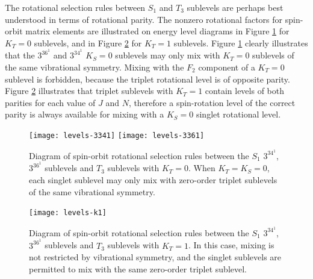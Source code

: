 \documentclass[12pt]{mitthesis}
\begin{document}

The rotational selection rules between $S_1$ and $T_3$ sublevels are
perhaps best understood in terms of rotational parity.  The nonzero
rotational factors for spin-orbit matrix elements are illustrated on
energy level diagrams in Figure \ref{fig:levels-k0} for $K_T=0$
sublevels, and in Figure \ref{fig:levels-k1} for $K_T=1$ sublevels.
Figure \ref{fig:levels-k0} clearly illustrates that the $3^36^1$ and
$3^34^1$ $K_S=0$ sublevels may only mix with $K_T=0$ sublevels of the
same vibrational symmetry.  Mixing with the $F_2$ component of a
$K_T=0$ sublevel is forbidden, because the triplet rotational level is
of opposite parity.  Figure \ref{fig:levels-k1} illustrates that
triplet sublevels with $K_T=1$ contain levels of both parities for
each value of $J$ and $N$, therefore a spin-rotation level of the
correct parity is always available for mixing with a $K_S=0$ singlet
rotational level.



\begin{figure}
  \caption{Diagram of spin-orbit rotational selection rules between
    the $S_1$ $3^34^1$, $3^36^1$  sublevels and $T_3$ sublevels
    with $K_T=0$.  When $K_T=K_S=0$, each singlet sublevel may only
    mix with zero-order triplet sublevels of the same vibrational
    symmetry.}
  \label{fig:levels-k0}
  \centering
  \vspace{5mm}
  \texttt{[image: levels-3341]}
  \texttt{[image: levels-3361]}  
\end{figure}

\begin{figure}
  \caption{Diagram of spin-orbit rotational selection rules between
    the $S_1$ $3^34^1$, $3^36^1$  sublevels and $T_3$ sublevels
    with $K_T=1$.  In this case, mixing is not restricted by
    vibrational symmetry, and the singlet sublevels are permitted to
    mix with the same zero-order triplet sublevel.}
  \label{fig:levels-k1}
  \centering
  \vspace{5mm}
  \texttt{[image: levels-k1]}
\end{figure}

\end{document}
